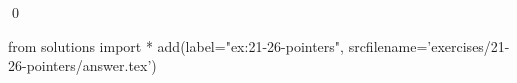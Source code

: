 
\begin{ex}
  \label{ex:21-26-pointers}
  
  \qed
\end{ex}
\begin{python0}
from solutions import *
add(label="ex:21-26-pointers",
    srcfilename='exercises/21-26-pointers/answer.tex')
\end{python0}
